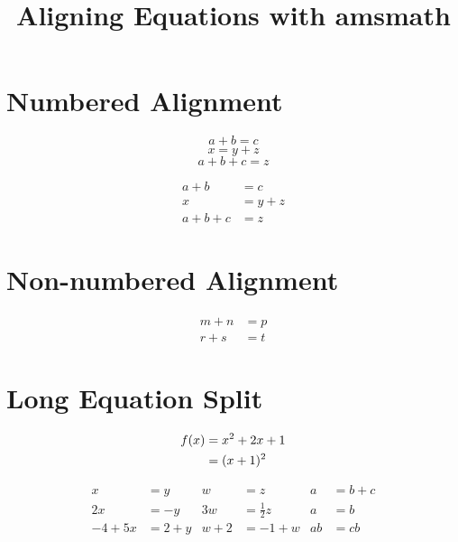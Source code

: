 \documentclass{article}
\title{Aligning Equations with amsmath}
\date{}
\begin{document}
\maketitle

\section*{Numbered Alignment}

\begin{equation}
a + b = c 
\end{equation}
\begin{equation}
x = y + z     
\end{equation}
\begin{equation}
a+b+c=z        
\end{equation}


\begin{align}
a + b &= c \\
x &= y + z \\
a+b+c&=z
\end{align}

\section*{Non-numbered Alignment}
\begin{align*}
m + n &= p \\
r + s &= t
\end{align*}

\section*{Long Equation Split}
\begin{align}
f(x) &= x^2 + 2x + 1 \notag \\
     &= (x + 1)^2
\end{align}

\begin{align*}
x&=y & w &=z & a&=b+c\\
2x&=-y & 3w&=\frac{1}{2}z & a&=b\\
-4 + 5x&=2+y & w+2&=-1+w & ab&=cb
\end{align*}
\end{document}
